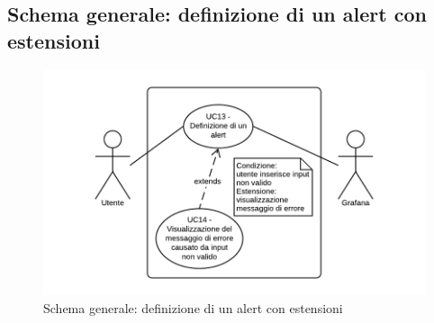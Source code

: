 \subsection{Schema generale: definizione di un alert con estensioni}
\begin{figure}[H]
\includegraphics{img/UC13 - Schema generale.png}
\caption{Schema generale: definizione di un alert con estensioni}
\end{figure}
